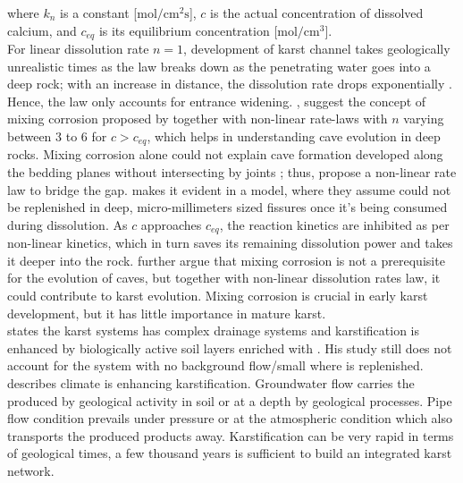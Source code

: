 where $k_n$ is a constant [$\mathrm{mol/cm^2s}$], $c$ is the actual concentration of dissolved calcium, and $c_{eq}$ is its 
equilibrium concentration [$\mathrm{mol/cm^3}$].\\
For linear dissolution rate $n = 1$, development of karst channel takes geologically unrealistic times as the law 
breaks down as the penetrating water goes into a deep rock; with an increase in distance, the dissolution rate drops 
exponentially \cite{Dreybrodt1996}. Hence, the law only accounts for entrance widening. 
\citet{dreybrodt2004dissolution}, \citet{gabrovvsek2000role} suggest the concept of mixing corrosion 
proposed by \citet{bogli1980physical} together with non-linear rate-laws with $n$ varying between 3 to 6 for $c > c_{eq}$, 
which helps in understanding cave evolution in deep rocks. Mixing corrosion alone could not explain cave formation developed 
along the bedding planes without intersecting by joints \cite{ford1978development}; thus, \citet{gabrovvsek2000role} propose 
a non-linear rate law to bridge the gap. \citet{gabrovvsek2000role} makes it evident in a model, where they assume  
could not be replenished in deep, micro-millimeters sized fissures once it's being consumed during dissolution. As $c$ 
approaches $c_{eq}$, the reaction kinetics are inhibited as per non-linear kinetics, which in turn saves its remaining 
dissolution power and takes it deeper into the rock. \citet{gabrovvsek2000role} further argue that mixing corrosion is not 
a prerequisite for the evolution of caves, but together with non-linear dissolution rates law, it could contribute to karst 
evolution. Mixing corrosion \cite{bogli1980physical} is crucial in early karst development, but it has little importance in 
mature karst. \\



\citet{bonacci2001analysis} states the karst systems has complex drainage systems and karstification is enhanced by biologically 
active soil layers enriched with . His study still does not account for the system with no background flow/small 
where  is replenished. \\

\citet{bakalowicz2005karst} describes climate is enhancing karstification. Groundwater flow carries the produced  by 
geological activity in soil or at a depth by geological processes. Pipe flow condition prevails under pressure or at the 
atmospheric condition which also transports the produced products away. Karstification can be very rapid in terms of geological 
times, a few thousand years is sufficient to build an integrated karst network.\\

